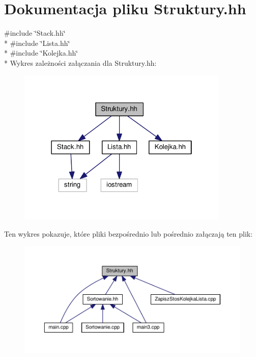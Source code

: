 \section{Dokumentacja pliku Struktury.\-hh}
\label{_struktury_8hh}
{\ttfamily \#include \char`\"{}Stack.\-hh\char`\"{}}\\*
{\ttfamily \#include \char`\"{}Lista.\-hh\char`\"{}}\\*
{\ttfamily \#include \char`\"{}Kolejka.\-hh\char`\"{}}\\*
Wykres zależności załączania dla Struktury.\-hh\-:
\nopagebreak
\begin{figure}[H]
\begin{center}
\leavevmode
\includegraphics[width=286pt]{_struktury_8hh__incl}
\end{center}
\end{figure}
Ten wykres pokazuje, które pliki bezpośrednio lub pośrednio załączają ten plik\-:
\nopagebreak
\begin{figure}[H]
\begin{center}
\leavevmode
\includegraphics[width=350pt]{_struktury_8hh__dep__incl}
\end{center}
\end{figure}
